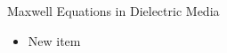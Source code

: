 \begin{frame}{Maxwell Equations in Dielectric Media}
\label{fr:meq_dielectric_intro}

\begin{itemize}
\item New item
\end{itemize}

\end{frame}